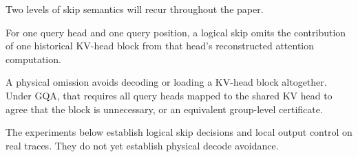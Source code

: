 \begin{table}[t]
  \centering
  \small
  
  \caption{Notation used throughout the paper.}
  \label{tab:notation}
\end{table}

Two levels of skip semantics will recur throughout the paper.
\begin{definition}
For one query head and one query position, a logical skip omits the contribution of one historical KV-head block from that head's reconstructed attention computation.
\end{definition}

\begin{definition}
A physical omission avoids decoding or loading a KV-head block altogether. Under GQA, that requires all query heads mapped to the shared KV head to agree that the block is unnecessary, or an equivalent group-level certificate.
\end{definition}

The experiments below establish logical skip decisions and local output control on real traces. They do not yet establish physical decode avoidance.
